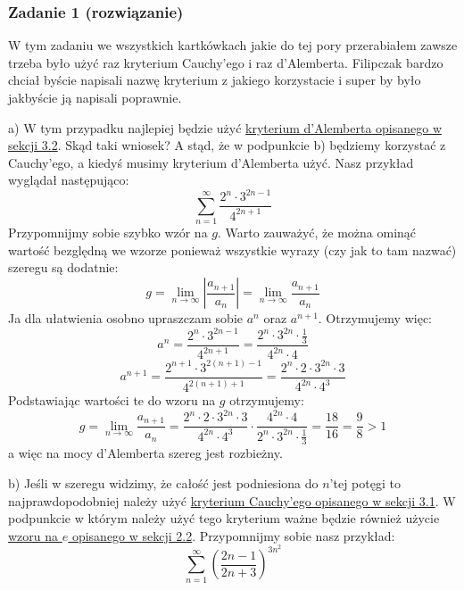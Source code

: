 \documentclass[11pt]{article}
\begin{document}
\subsubsection{Zadanie 1 (rozwiązanie)}
W tym zadaniu we wszystkich kartkówkach jakie do tej pory przerabiałem zawsze trzeba było użyć raz
kryterium Cauchy'ego i raz d'Alemberta. Filipczak bardzo chciał byście napisali nazwę
kryterium z jakiego korzystacie i super by było jakbyście ją napisali poprawnie.
\begin{list}{}{}
    \item[a)]{
        W tym przypadku najlepiej będzie użyć \hyperlink{subsection.3.2}{kryterium d'Alemberta opisanego w sekcji 3.2}. Skąd taki wniosek?
        A stąd, że w podpunkcie b) będziemy korzystać z Cauchy'ego, a kiedyś musimy kryterium d'Alemberta użyć.
        Nasz przykład wyglądał następująco:
        \[
            \sum_{n = 1}^{\infty}\frac{2^n \cdot 3^{2n - 1}}{4^{2n + 1}}
        \]
        Przypomnijmy sobie szybko wzór na $g$. Warto zauważyć, że można ominąć wartość
        bezględną we wzorze ponieważ wszystkie wyrazy (czy jak to tam nazwać) szeregu są dodatnie:
        \[
            g = \lim_{n\to\infty}{\left\lvert \frac{a_{n + 1}}{a_n} \right\rvert}
            =  \lim_{n\to\infty}{ \frac{a_{n + 1}}{a_n} }
        \]
        Ja dla ułatwienia osobno upraszczam sobie $a^n$ oraz $a^{n + 1}$. Otrzymujemy więc:
        \[
            a^n = \frac{2^n \cdot 3^{2n - 1}}{4^{2n + 1}}=\frac{2^n \cdot 3^{2n} \cdot \frac{1}{3}}{4^{2n} \cdot 4}
        \]
        \[
            a^{n + 1} = \frac{2^{n + 1} \cdot 3^{2(n + 1) - 1}}{4^{2(n + 1) + 1}}=\frac{2^n \cdot 2 \cdot 3^{2n} \cdot 3}{4^{2n} \cdot 4^3}
        \]
        Podstawiając wartości te do wzoru na $g$ otrzymujemy:
        \[
            g =  \lim_{n\to\infty}{ \frac{a_{n + 1}}{a_n} }
            = \frac{2^n \cdot 2 \cdot 3^{2n} \cdot 3}{4^{2n} \cdot 4^3} \cdot \frac{4^{2n} \cdot 4}{2^n \cdot 3^{2n} \cdot \frac{1}{3}}
            = \frac{18}{16} = \frac{9}{8} > 1
        \]
        a więc na mocy d'Alemberta szereg jest rozbieżny.
    }
    \item[b)]{
        Jeśli w szeregu widzimy, że całość jest podniesiona do $n$'tej
        potęgi to najprawdopodobniej należy użyć \hyperlink{subsection.3.1}{kryterium Cauchy'ego opisanego w sekcji 3.1}.
        W podpunkcie w którym należy użyć tego kryterium ważne będzie również użycie \hyperlink{subsection.2.2}{wzoru na $e$ opisanego w sekcji 2.2}.
        Przypomnijmy sobie nasz przykład:
        \[
            \sum_{n = 1}^{\infty}(\frac{2n - 1}{2n + 3})^{3n^2}
\]}
\end{list}
\end{document}
